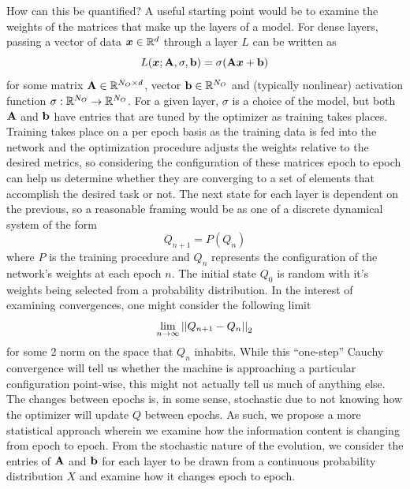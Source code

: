 How can this be quantified? A useful starting point would be to examine the weights of
the matrices that make up the layers of a model. For dense layers, passing a vector of 
data $\boldsymbol{x} \in \mathbb{R}^{d}$ through a layer $L$ can be written as 
\begin{equation}
    L(\boldsymbol{x}; {\bf A}, \sigma, {\bf b}) = \sigma({\bf A}\boldsymbol{x} + {\bf b})
\end{equation}
for some matrix ${\bf A} \in \mathbb{R}^{N_O\times d}$, vector ${\bf b} \in \mathbb{R}^{N_O}$ and (typically nonlinear)
activation function $\sigma: \mathbb{R}^{N_O} \to \mathbb{R}^{N_O}$. For a given layer, $\sigma$ is a choice of the 
model, but both ${\bf A}$ and ${\bf b}$ have entries that are tuned by the 
optimizer as training takes places. Training takes place on a per epoch basis as the training data 
is fed into the network and the optimization procedure adjusts the weights relative to the desired 
metrics, so considering the configuration of these matrices epoch to epoch can help us 
determine whether they are converging to a set of elements that accomplish the desired 
task or not. The next state for each layer is dependent on the previous, so a reasonable 
framing would be as one of a discrete dynamical system of the form
\begin{equation}
    Q_{n+1} = P(Q_n)
\end{equation}
where $P$ is the training procedure and $Q_n$ represents the configuration of the network's
weights at each epoch $n$. The initial state $Q_0$ is random with it's weights being
selected from a probability distribution. In the interest of examining 
convergences, one might consider the following limit 
\begin{equation}
    \lim_{n\to\infty} \left|\left|Q_{n+1} - Q_n\right|\right|_2    
\end{equation}
for some 2 norm on the space that $Q_n$ inhabits. While this ``one-step'' Cauchy 
convergence will tell us whether the machine is approaching a particular configuration
point-wise, this might not actually tell us much of anything else. The changes between 
epochs is, in some sense, stochastic due to not knowing how the optimizer will update $Q$
between epochs. As such, we propose a more statistical approach wherein we examine how the
information content is changing from epoch to epoch. From the stochastic nature of the 
evolution, we consider the entries of ${\bf A}$ and ${\bf b}$ for each layer to be drawn from a continuous 
probability distribution $X$ and examine how it changes epoch to epoch. 


